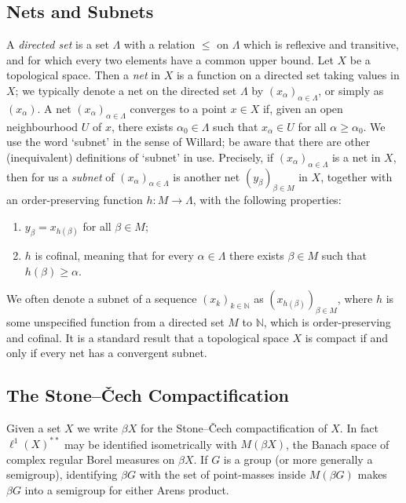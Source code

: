 \documentclass[twoside,11pt]{amsart}
\numberwithin{equation}{section}
\theoremstyle{definition}
\newcommand {\N}{\mathbb N}
\newcommand{\1}{\mathbbm{1}}
\begin{document}
	\subsection{Nets and Subnets}
	A \textit{directed set} is a set $\Lambda$  with a relation $\leq$ on $\Lambda$ which is reflexive and transitive, and for which every two elements have a common upper bound. 
	Let $X$ be a topological space. Then a \textit{net} in $X$ is a function on a directed set taking values in $X$; we typically denote a net on the directed set $\Lambda$ by $(x_{\alpha})_{\alpha \in \Lambda}$, or simply as $(x_\alpha)$. 
	A net $(x_\alpha)_{\alpha \in \Lambda}$ converges to a point $x \in X$ if, given an open neighbourhood $U$ of $x$, there exists $\alpha_0 \in \Lambda$ such that $x_\alpha \in U$ for all $\alpha \geq \alpha_0$.
	We use the word `subnet' in the sense of Willard; be aware that there are other (inequivalent) definitions of `subnet' in use.
	Precisely, if $(x_\alpha)_{\alpha \in \Lambda}$ is a net in $X$, then for us a \textit{subnet} of $(x_\alpha)_{\alpha \in \Lambda}$ is another net $(y_\beta)_{\beta \in M}$ in $X$, together with an order-preserving function $h \colon M \to \Lambda$, with the following properties:
	\begin{enumerate}
	\item $y_\beta = x_{h(\beta)}$ for all $\beta \in M$;
	\item $h$ is cofinal, meaning that for every $\alpha \in \Lambda$ there exists $\beta \in M$ such that 
	$h(\beta) \geq \alpha$.	
	\end{enumerate}
	 We often denote a subnet of a sequence $(x_k)_{k \in \N}$ as $(x_{h(\beta)})_{\beta \in M}$, where $h$ is some unspecified function from a directed set $M$ to $\N$, which is order-preserving and cofinal. It is a standard result that a topological space $X$ is compact if and only if every net has a convergent subnet.
	
	\subsection{The Stone--{\v C}ech Compactification}	 
	Given a set $X$ we write $\beta X$ for the Stone--{\v C}ech compactification of $X$.  In fact $\ell^1(X)^{**}$ may be identified isometrically with $M(\beta X)$, the Banach space of complex regular Borel measures on $\beta X$. If $G$ is a group (or more generally a semigroup), identifying $\beta G$ with the set of point-masses inside $M(\beta G)$ makes $\beta G$ into a semigroup for either Arens product. 
	
\end{document}
